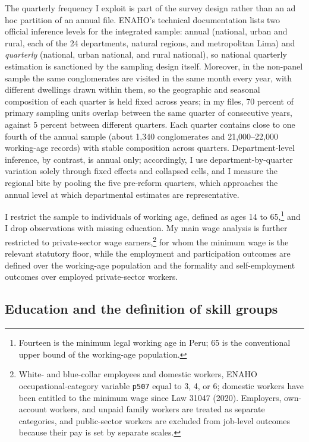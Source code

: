 The quarterly frequency I exploit is part of the survey design rather than an ad hoc
partition of an annual file. ENAHO's technical documentation lists two official
inference levels for the integrated sample: annual (national, urban and rural,
each of the 24 departments, natural regions, and metropolitan Lima) and
\emph{quarterly} (national, urban national, and rural national), so national
quarterly estimation is sanctioned by the sampling design itself. Moreover, in the
non-panel sample the same conglomerates are visited in the same month every year,
with different dwellings drawn within them, so the geographic and seasonal
composition of each quarter is held fixed across years; in my files, 70 percent of
primary sampling units overlap between the same quarter of consecutive years,
against 5 percent between different quarters. Each quarter contains close to one
fourth of the annual sample (about 1{,}340 conglomerates and 21{,}000--22{,}000
working-age records) with stable composition across quarters. Department-level
inference, by contrast, is annual only; accordingly, I use department-by-quarter
variation solely through fixed effects and collapsed cells, and I measure the
regional bite by pooling the five pre-reform quarters, which approaches the annual
level at which departmental estimates are representative.

I restrict the sample to individuals of working age, defined as ages 14 to 65,\footnote{Fourteen
is the minimum legal working age in Peru; 65 is the conventional upper bound of the working-age
population.} and
I drop observations with missing education. My main wage analysis is further
restricted to private-sector wage earners,\footnote{White- and blue-collar employees and
domestic workers, ENAHO occupational-category variable \texttt{p507} equal to 3, 4, or 6;
domestic workers have been entitled to the minimum wage since Law 31047 (2020).
Employers, own-account workers, and unpaid family workers are treated as separate
categories, and public-sector workers are excluded from job-level outcomes because their
pay is set by separate scales.} for whom the minimum wage is the relevant
statutory floor, while the employment and participation outcomes are defined over the
working-age population and the formality and self-employment outcomes over employed
private-sector workers.

\subsection{Education and the definition of skill groups}

